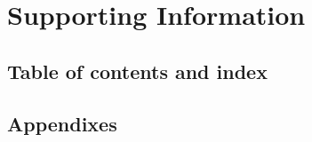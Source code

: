 \section{Supporting Information}

\subsection{Table of contents and index}


\subsection{Appendixes}






% 
% 
% 
% 
% 
